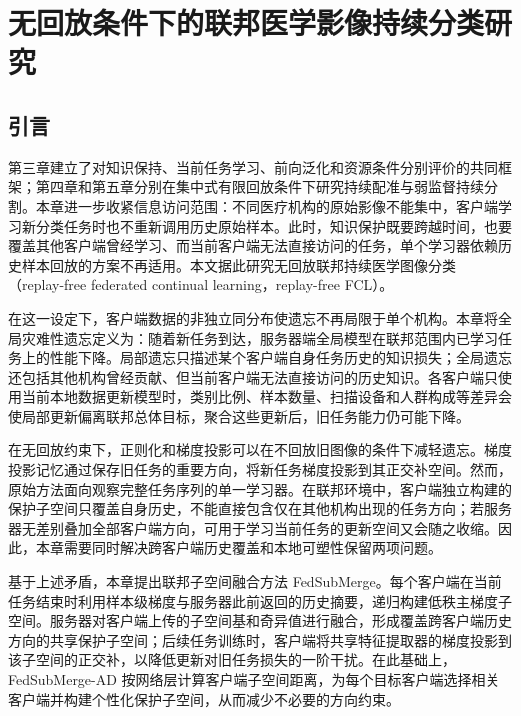 \chapter{无回放条件下的联邦医学影像持续分类研究}
\label{chap:fedsubmerge}
\setlength{\emergencystretch}{1em}

\section{引言}
\label{sec:fedsubmerge-introduction}

第三章建立了对知识保持、当前任务学习、前向泛化和资源条件分别评价的共同框架；第四章和第五章分别在集中式有限回放条件下研究持续配准与弱监督持续分割。本章进一步收紧信息访问范围：不同医疗机构的原始影像不能集中，客户端学习新分类任务时也不重新调用历史原始样本。此时，知识保护既要跨越时间，也要覆盖其他客户端曾经学习、而当前客户端无法直接访问的任务，单个学习器依赖历史样本回放的方案不再适用。本文据此研究无回放联邦持续医学图像分类（replay-free federated continual learning，replay-free FCL）\cite{mcmahan2017fedavg,rieke2020future,yoon2021fedweit}。

在这一设定下，客户端数据的非独立同分布使遗忘不再局限于单个机构。本章将全局灾难性遗忘定义为：随着新任务到达，服务器端全局模型在联邦范围内已学习任务上的性能下降。局部遗忘只描述某个客户端自身任务历史的知识损失；全局遗忘还包括其他机构曾经贡献、但当前客户端无法直接访问的历史知识。各客户端只使用当前本地数据更新模型时，类别比例、样本数量、扫描设备和人群构成等差异会使局部更新偏离联邦总体目标，聚合这些更新后，旧任务能力仍可能下降\cite{dong2022glfc}。

在无回放约束下，正则化和梯度投影可以在不回放旧图像的条件下减轻遗忘。梯度投影记忆通过保存旧任务的重要方向，将新任务梯度投影到其正交补空间\cite{saha2021gpm}。然而，原始方法面向观察完整任务序列的单一学习器。在联邦环境中，客户端独立构建的保护子空间只覆盖自身历史，不能直接包含仅在其他机构出现的任务方向；若服务器无差别叠加全部客户端方向，可用于学习当前任务的更新空间又会随之收缩。因此，本章需要同时解决跨客户端历史覆盖和本地可塑性保留两项问题。

基于上述矛盾，本章提出联邦子空间融合方法 FedSubMerge。每个客户端在当前任务结束时利用样本级梯度与服务器此前返回的历史摘要，递归构建低秩主梯度子空间。服务器对客户端上传的子空间基和奇异值进行融合，形成覆盖跨客户端历史方向的共享保护子空间；后续任务训练时，客户端将共享特征提取器的梯度投影到该子空间的正交补，以降低更新对旧任务损失的一阶干扰。在此基础上，FedSubMerge-AD 按网络层计算客户端子空间距离，为每个目标客户端选择相关客户端并构建个性化保护子空间，从而减少不必要的方向约束。

